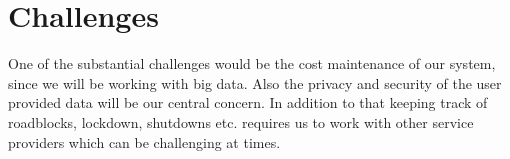 \documentclass[11pt]{article}
\begin{document}
    \section*{Challenges}
    {\sffamily One of the substantial challenges would be the cost maintenance of our system, since we will be working with big data. Also the privacy and security of the user provided data will be our central concern. In addition to that keeping track of roadblocks, lockdown, shutdowns etc. requires us to work with other service providers which can be challenging at times.}
      
    
\end{document}
